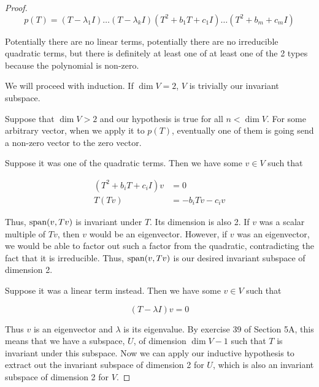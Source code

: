 \begin{enumerate}
\begin{proof}
        $$p(T) = (T - \lambda_1I)\dots(T - \lambda_k I)(T^2 + b_1T + c_1I)\dots(T^2 + b_m + c_mI)$$

        Potentially there are no linear terms, potentially there are no irreducible quadratic terms, but there is definitely at least one of at least one of the 2 types because the polynomial is non-zero.

        We will proceed with induction. If $\dim V = 2$, $V$ is trivially our invariant subspace.

        Suppose that $\dim V > 2$ and our hypothesis is true for all $n < \dim V$. For some arbitrary vector, when we apply it to $p(T)$, eventually one of them is going send a non-zero vector to the zero vector. 

        Suppose it was one of the quadratic terms. Then we have some $v \in V$ such that 

        \begin{align*}
            (T^2 + b_iT + c_iI)v &= 0 \\
            T(Tv) &= -b_iTv - c_iv 
        \end{align*}

        Thus, $\text{span}(v, Tv)$ is invariant under $T$. Its dimension is also 2. If $v$ was a scalar multiple of $Tv$, then $v$ would be an eigenvector. However, if $v$ was an eigenvector, we would be able to factor out such a factor from the quadratic, contradicting the fact that it is irreducible. Thus, $\text{span}(v, Tv)$ is our desired invariant subspace of dimension 2.

        Suppose it was a linear term instead. Then we have some $v \in V$ such that 

        $$(T - \lambda I)v = 0$$

        Thus $v$ is an eigenvector and $\lambda$ is its eigenvalue. By exercise 39 of Section 5A, this means that we have a subspace, $U$, of dimension $\dim V - 1$ such that $T$ is invariant under this subspace. Now we can apply our inductive hypothesis to extract out the invariant subspace of dimension 2 for $U$, which is also an invariant subspace of dimension 2 for $V$.

        


    \end{proof}

\end{enumerate}